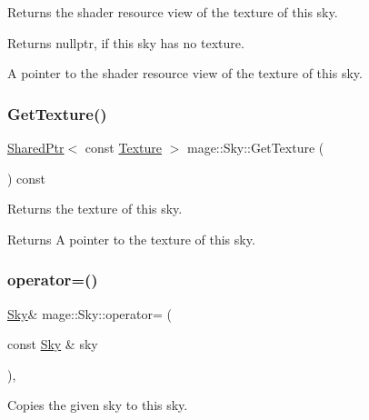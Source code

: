 Returns the shader resource view of the texture of this sky.

\begin{DoxyReturn}{Returns}
{\ttfamily nullptr}, if this sky has no texture. 

A pointer to the shader resource view of the texture of this sky. 
\end{DoxyReturn}
\hypertarget{classmage_1_1_sky_abd49f247b3a376475471310d6396386b}{}\label{classmage_1_1_sky_abd49f247b3a376475471310d6396386b} 
\subsubsection{\texorpdfstring{Get\+Texture()}{GetTexture()}}
{\footnotesize\ttfamily \hyperlink{namespacemage_a1e01ae66713838a7a67d30e44c67703e}{Shared\+Ptr}$<$ const \hyperlink{classmage_1_1_texture}{Texture} $>$ mage\+::\+Sky\+::\+Get\+Texture (\begin{DoxyParamCaption}{ }\end{DoxyParamCaption}) const\hspace{0.3cm}{\ttfamily [noexcept]}}

Returns the texture of this sky.

\begin{DoxyReturn}{Returns}
A pointer to the texture of this sky. 
\end{DoxyReturn}
\hypertarget{classmage_1_1_sky_a34b877c6cff140cae6a207337651ea4e}{}\label{classmage_1_1_sky_a34b877c6cff140cae6a207337651ea4e} 
\subsubsection{\texorpdfstring{operator=()}{operator=()}\hspace{0.1cm}{\footnotesize\ttfamily [1/2]}}
{\footnotesize\ttfamily \hyperlink{classmage_1_1_sky}{Sky}\& mage\+::\+Sky\+::operator= (\begin{DoxyParamCaption}\item[{const \hyperlink{classmage_1_1_sky}{Sky} \&}]{sky }\end{DoxyParamCaption})\hspace{0.3cm}{\ttfamily [default]}, {\ttfamily [noexcept]}}

Copies the given sky to this sky.


